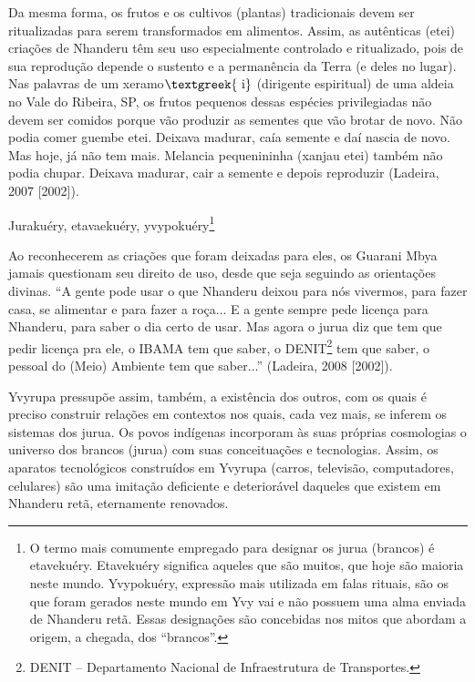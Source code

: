 \documentclass{article}
\begin{document}
Da mesma forma, os frutos e os cultivos (plantas) tradicionais devem ser
ritualizadas para serem transformados em alimentos. Assim, as
aut\^enticas (etei) cria\c{c}\~oes de Nhanderu t\^em seu uso
especialmente controlado e ritualizado, pois de sua reprodu\c{c}\~ao
depende o sustento e a perman\^encia da Terra (e deles no lugar). Nas
palavras de um xeramo$\text{\textgreek{~i}}$ (dirigente espiritual) de
uma aldeia no Vale do Ribeira, SP, os frutos pequenos dessas esp\'ecies
privilegiadas n\~ao devem ser comidos porque v\~ao produzir as sementes
que v\~ao brotar de novo. N\~ao podia comer guembe etei. Deixava
madurar, ca\'ia semente e da\'i nascia de novo. Mas hoje, j\'a n\~ao
tem mais. Melancia pequenininha (xanjau etei) tamb\'em n\~ao podia
chupar. Deixava madurar, cair a semente e depois reproduzir (Ladeira,
2007 [2002]).

Juraku\'ery, etavaeku\'ery, yvypoku\'ery\footnote{ O termo mais
comumente empregado para designar os jurua (brancos) \'e etaveku\'ery.
Etaveku\'ery significa aqueles que s\~ao muitos, que hoje s\~ao maioria
neste mundo. Yvypoku\'ery, express\~ao mais utilizada em falas rituais,
s\~ao os que foram gerados neste mundo em Yvy vai e n\~ao possuem uma
alma enviada de Nhanderu ret\~a. Essas designa\c{c}\~oes s\~ao
concebidas nos mitos que abordam a origem, a chegada, dos
{\textquotedblleft}brancos{\textquotedblright}.}

Ao reconhecerem as cria\c{c}\~oes que foram deixadas para eles, os
Guarani Mbya jamais questionam seu direito de uso, desde que seja
seguindo as orienta\c{c}\~oes divinas. {\textquotedblleft}A gente pode
usar o que Nhanderu deixou para n\'os vivermos, para fazer casa, se
alimentar e para fazer a ro\c{c}a... E a gente sempre pede licen\c{c}a
para Nhanderu, para saber o dia certo de usar. Mas agora o jurua diz
que tem que pedir licen\c{c}a pra ele, o IBAMA tem que saber, o
DENIT\footnote{ DENIT -- Departamento Nacional de Infraestrutura de
Transportes.} tem que saber, o pessoal do (Meio) Ambiente tem que
saber...{\textquotedblright} (Ladeira, 2008 [2002]).

Yvyrupa pressup\~oe assim, tamb\'em, a exist\^encia dos outros, com os
quais \'e preciso construir rela\c{c}\~oes em contextos nos quais, cada
vez mais, se inferem os sistemas dos jurua. Os povos ind\'igenas
incorporam \`as suas pr\'oprias cosmologias o universo dos brancos
(jurua) com suas conceitua\c{c}\~oes e tecnologias. Assim, os aparatos
tecnol\'ogicos constru\'idos em Yvyrupa (carros, televis\~ao,
computadores, celulares) s\~ao uma imita\c{c}\~ao deficiente e
deterior\'avel daqueles que existem em Nhanderu ret\~a, eternamente
renovados.
\end{document}
